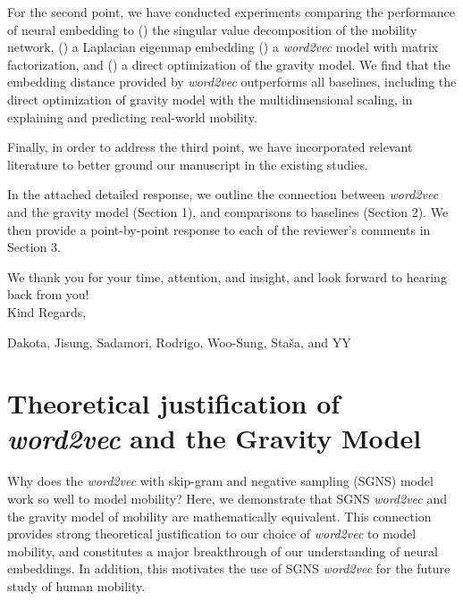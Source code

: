 \documentclass[12pt,a4paper]{article}
\newcounter{comment}[subsection]
\begin{document}
For the second point, we have conducted experiments comparing the performance of neural embedding to () the singular value decomposition of the mobility network,  () a Laplacian eigenmap embedding  () a \textit{word2vec} model with matrix factorization,  and  () a direct optimization of the gravity model. We find that the embedding distance provided by \textit{word2vec} outperforms all baselines, including the direct optimization of gravity model with the multidimensional scaling, in explaining and predicting real-world mobility.

Finally, in order to address the third point, we have incorporated relevant literature to better ground our manuscript in the existing studies.

In the attached detailed response, we outline the connection between \textit{word2vec} and the gravity model (Section 1), and comparisons to baselines (Section 2). We then provide a point-by-point response to each of the reviewer's comments in Section 3.

We thank you for your time, attention, and insight, and look forward to hearing back from you!\\

Kind Regards,

Dakota, Jisung, Sadamori, Rodrigo, Woo-Sung, Staša, and YY

\clearpage
{}
\setcounter{page}{1}
\tableofcontents
\clearpage

\section{Theoretical justification of \textit{word2vec} and the Gravity Model}
\label{sec:theory}
\thispagestyle{empty}
Why does the \textit{word2vec} with skip-gram and negative sampling (SGNS) model work so well to model mobility?
Here, we demonstrate that SGNS {\it word2vec} and the gravity model of mobility are mathematically equivalent.
This connection provides strong theoretical justification to our choice of \textit{word2vec} to model mobility, and constitutes a major breakthrough of our understanding of neural embeddings.
In addition, this motivates the use of SGNS {\it word2vec} for the future study of human mobility.
\end{document}
